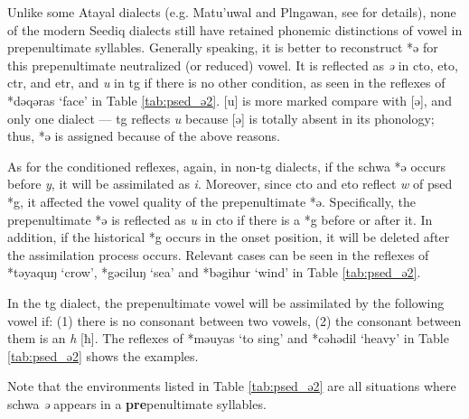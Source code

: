 Unlike some Atayal dialects (e.g. Matu'uwal and Plngawan, see \cite{goderich2020phd} for details), none of the modern Seediq dialects still have retained phonemic distinctions of vowel in prepenultimate syllables. Generally speaking, it is better to reconstruct *ə for this prepenultimate neutralized (or reduced) vowel. It is reflected as \textit{ə} in \acl{cto}, \acl{eto}, \acl{ctr}, and \acl{etr}, and \textit{u} in \acl{tg} if there is no other condition, as seen in the reflexes of *dəqəras `face' in Table \ref{tab:psed_ə2}. [u] is more marked compare with [ə], and only one dialect --- \acl{tg} reflects \textit{u} because [ə] is totally absent in its phonology; thus, *ə is assigned because of the above reasons. 

As for the conditioned reflexes, again, in non-\acl{tg} dialects, if the schwa *ə occurs before \textit{y}, it will be assimilated as \textit{i}. Moreover, since \acl{cto} and \acl{eto} reflect \textit{w} of \acl{psed} *g, it affected the vowel quality of the prepenultimate *ə. Specifically, the prepenultimate *ə is reflected as \textit{u} in \acl{cto} if there is a *g before or after it. In addition, if the historical *g occurs in the onset position, it will be deleted after the assimilation process occurs. Relevant cases can be seen in the reflexes of *təyaquŋ `crow', *gəciluŋ `sea' and *bəgihur `wind' in Table \ref{tab:psed_ə2}. 

In the \acl{tg} dialect, the prepenultimate vowel will be assimilated by the following vowel if: (1) there is no consonant between two vowels, (2) the consonant between them is an \textit{h} [ħ]. The reflexes of *məuyas `to sing' and *cəhədil `heavy' in Table \ref{tab:psed_ə2} shows the examples. 

Note that the environments listed in Table \ref{tab:psed_ə2} are all situations where schwa \textit{ə} appears in a \textbf{pre}penultimate syllables.


